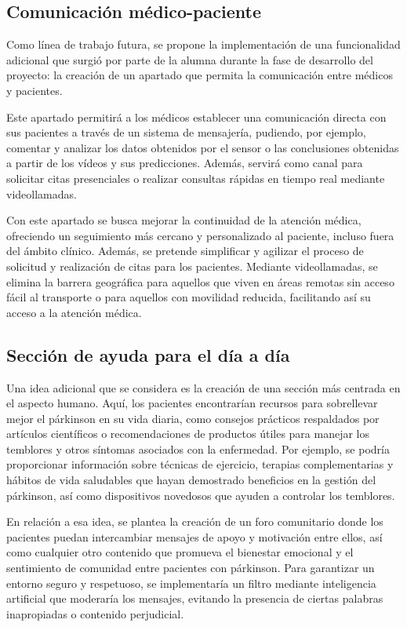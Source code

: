 \subsection{Comunicación médico-paciente}
Como línea de trabajo futura, se propone la implementación de una funcionalidad adicional que surgió por parte de la alumna durante la fase de desarrollo del proyecto: la creación de un apartado que permita la comunicación entre médicos y pacientes.

Este apartado permitirá a los médicos establecer una comunicación directa con sus pacientes a través de un sistema de mensajería, pudiendo, por ejemplo, comentar y analizar los datos obtenidos por el sensor o las conclusiones obtenidas a partir de los vídeos y sus predicciones. 
Además, servirá como canal para solicitar citas presenciales o realizar consultas rápidas en tiempo real mediante videollamadas.

Con este apartado se busca mejorar la continuidad de la atención médica, ofreciendo un seguimiento más cercano y personalizado al paciente, incluso fuera del ámbito clínico. Además, se pretende simplificar y agilizar el proceso de solicitud y realización de citas para los pacientes. Mediante videollamadas, se elimina la barrera geográfica para aquellos que viven en áreas remotas sin acceso fácil al transporte o para aquellos con movilidad reducida, facilitando así su acceso a la atención médica.


\subsection{Sección de ayuda para el día a día}
Una idea adicional que se considera es la creación de una sección más centrada en el aspecto humano. Aquí, los pacientes encontrarían recursos para sobrellevar mejor el párkinson en su vida diaria, como consejos prácticos respaldados por artículos científicos o recomendaciones de productos útiles para manejar los temblores y otros síntomas asociados con la enfermedad. Por ejemplo, se podría proporcionar información sobre técnicas de ejercicio, terapias complementarias y hábitos de vida saludables que hayan demostrado beneficios en la gestión del párkinson, así como dispositivos novedosos que ayuden a controlar los temblores.

En relación a esa idea, se plantea la creación de un foro comunitario donde los pacientes puedan intercambiar mensajes de apoyo y motivación entre ellos, así como cualquier otro contenido que promueva el bienestar emocional y el sentimiento de comunidad entre pacientes con párkinson. Para garantizar un entorno seguro y respetuoso, se implementaría un filtro mediante inteligencia artificial que moderaría los mensajes, evitando la presencia de ciertas palabras inapropiadas o contenido perjudicial.

